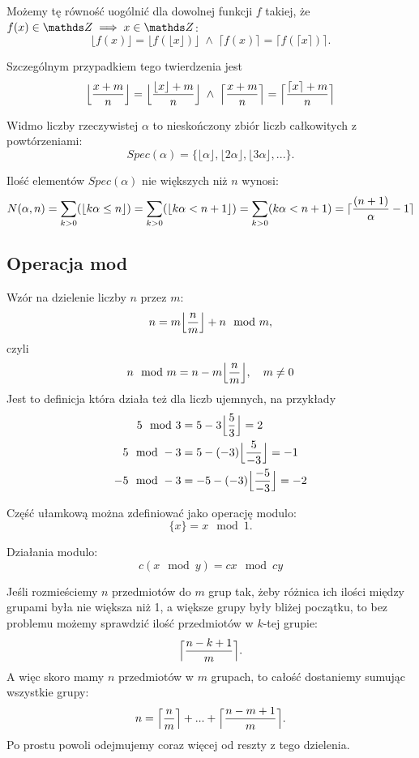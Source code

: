Możemy tę równość uogólnić dla dowolnej funkcji $f$ takiej, że $f(x)\in \Z\implies x\in \Z$:
$$\lfloor f(x)\rfloor=\lfloor f(\lfloor x\rfloor)\rfloor\;\land\; \lceil f(x)\rceil=\lceil f(\lceil x\rceil)\rceil.$$

Szczególnym przypadkiem tego twierdzenia jest
$$\Big\lfloor {x+m\over n}\Big\rfloor=\Big\lfloor {\lfloor x\rfloor+m\over n}\Big\rfloor\;\land\;\Big\lceil {x+m\over n}\Big\rceil=\Big\lceil {\lceil x\rceil+m\over n}\Big\rceil$$

\bigskip

\bigskip

{\color{def}Widmo liczby rzeczywistej} $\alpha$ to nieskończony zbiór liczb całkowitych z powtórzeniami:
$$Spec(\alpha) = \{\lfloor\alpha\rfloor, \lfloor2\alpha\rfloor, \lfloor3\alpha\rfloor, ...\}.$$

Ilość elementów $Spec(\alpha)$ nie większych niż $n$ wynosi:
\begin{align*}
    N(\alpha, n)=\sum\limits_{k>0}(\lfloor k\alpha\leq n\rfloor)=\sum\limits_{k>0}(\lfloor k\alpha<n+1\rfloor)=\sum\limits_{k>0}(k\alpha<n+1)=\lceil {(n+1)\over\alpha}-1\rceil
\end{align*}

\subsection{Operacja mod}

Wzór na dzielenie liczby $n$ przez $m$:
$$n=m\Big\lfloor{n\over m}\Big\rfloor + n\mod m,$$
czyli
$$n\mod m=n-m\Big\lfloor{n\over m}\Big\rfloor,\quad m\neq 0$$
Jest to definicja która działa też dla liczb ujemnych, na przykłady
\begin{align*}
    5\mod 3&=5-3\Big\lfloor {5\over 3}\Big\rfloor = 2\\
    5\mod -3&=5-(-3)\Big\lfloor {5\over -3}\Big\rfloor = -1\\
    -5\mod-3&=-5-(-3)\Big\lfloor{-5\over-3}\Big\rfloor = -2
\end{align*}

Część ułamkową można zdefiniować jako operację modulo:
$$\{x\}=x\mod1.$$

Działania modulo:
$$c(x\mod y)=cx\mod cy$$

Jeśli rozmieściemy $n$ przedmiotów do $m$ grup tak, żeby różnica ich ilości między grupami była nie większa niż 1, a większe grupy były bliżej początku, to bez problemu możemy sprawdzić ilość przedmiotów w $k$-tej grupie:
$$\Big\lceil{n-k+1\over m}\Big\rceil.$$
A więc skoro mamy $n$ przedmiotów w $m$ grupach, to całość dostaniemy sumując wszystkie grupy:
$$n=\Big\lceil{n\over m}\Big\rceil+...+\Big\lceil{n-m+1\over m}\Big\rceil.$$
Po prostu powoli odejmujemy coraz więcej od reszty z tego dzielenia.